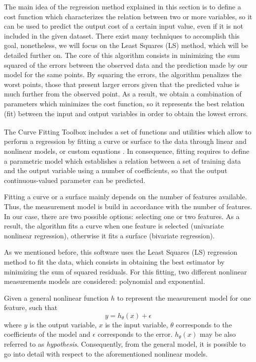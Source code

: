 \documentclass[a4paper, report, oneside, UKenglish]{memoir}
\begin{document}
The main idea of the regression method explained in this section is to define a cost function which characterizes the relation between two or more variables, so it can be used to predict the output cost of a certain input value, even if it is not included in the given dataset. There exist many techniques to accomplish this goal, nonetheless, we will focus on the Least Squares (LS) method, which will be detailed further on. The core of this algorithm consists in minimizing the sum squared of the errors between the observed data and the prediction made by our model for the same points. By squaring the errors, the algorithm penalizes the worst points, those that present larger errors given that the predicted value is much further from the observed point. As a result, we obtain a combination of parameters which minimizes the cost function, so it represents the best relation (fit) between the input and output variables in order to obtain the lowest errors. 


The Curve Fitting Toolbox\textsuperscript{\tiny\texttrademark} includes a set of functions and utilities which allow to perform a regression by fitting a curve or surface to the data through linear and nonlinear models, or custom equations \cite{MathWorksRegression}. In consequence, fitting requires to define a parametric model which establishes a relation between a set of training data and the output variable using a number of coefficients, so that the output continuous-valued parameter can be predicted. 

Fitting a curve or a surface mainly depends on the number of features available. Thus, the measurement model is build in accordance with the number of features. In our case, there are two possible options: selecting one or two features. As a result, the algorithm fits a curve when one feature is selected (univariate nonlinear regression), otherwise it fits a surface (bivariate regression).

As we mentioned before, this software uses the Least Squares (LS) regression method to fit the data, which consists in obtaining the best estimator by minimizing the sum of squared residuals. For this fitting, two different nonlinear measurements models are considered: polynomial and exponential. 

Given a general nonlinear function $h$ to represent the measurement model for one feature, such that
\begin{equation}
    y = h_\theta(x) + \epsilon
\end{equation}
where $y$ is the output variable, $x$ is the input variable, $\theta$ corresponds to the coefficients of the model and $\epsilon$ corresponds to the error. $h_\theta(x)$ may be also referred to as \textit{hypothesis}. Consequently, from the general model, it is possible to go into detail with respect to the aforementioned nonlinear models. 
\end{document}
